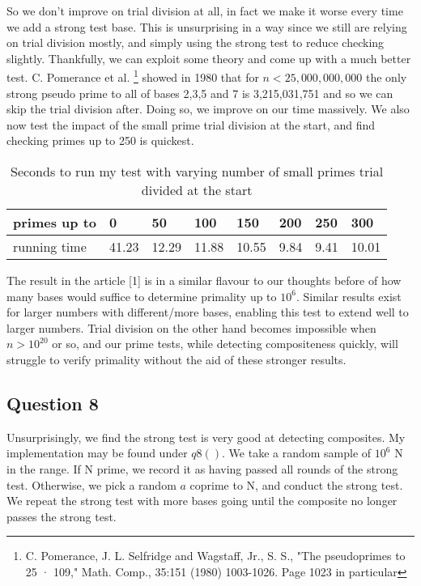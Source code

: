 \documentclass[10pt,a4paper]{report}
\begin{document}
So we don't improve on trial division at all, in fact we make it worse every time we add a strong test base. This is unsurprising in a way since we still are relying on trial division mostly, and simply using the strong test to reduce checking slightly. Thankfully, we can exploit some theory and come up with a much better test. C. Pomerance et al. \footnote{C. Pomerance, J. L. Selfridge and Wagstaff, Jr., S. S., "The pseudoprimes to 25 · 109," Math. Comp., 35:151 (1980) 1003-1026. Page 1023 in particular} showed  in 1980 that for $n < 25,000,000,000$ the only strong pseudo prime to all of bases 2,3,5 and 7 is  3,215,031,751 and so we can skip the trial division after. Doing so, we improve on our time massively. We also now test the impact of the small prime trial division at the start, and find checking primes up to 250 is quickest.\\

\begin{table}[h]
\centering
\begin{tabular}{|l|l|l|l|l|l|l|l|}
\hline
primes up to & 0     & 50    & 100   & 150   & 200  & 250  & 300   \\ \hline
running time & 41.23 & 12.29 & 11.88 & 10.55 & 9.84 & 9.41 & 10.01 \\ \hline
\end{tabular}
\caption{Seconds to run my test with varying number of small primes trial divided at the start}
\end{table}

The result in the article [1] is in a similar flavour to our thoughts before of how many bases would suffice to determine primality up to $10^6$. Similar results exist for larger numbers with different/more bases, enabling this test to extend well to larger numbers. Trial division on the other hand becomes impossible when $n>10^{20}$ or so, and our prime tests, while detecting compositeness quickly, will struggle to verify primality without the aid of these stronger results.\\




\subsection*{Question 8}
Unsurprisingly, we find the strong test is very good at detecting composites. My implementation may be found under $q8()$. We take a random sample of $10^6$ N in the range. If N prime, we record it as having passed all rounds of the strong test. Otherwise, we pick a random $a$ coprime to N, and conduct the strong test. We repeat the strong test with more bases going until the composite no longer passes the strong test.\\
\end{document}
